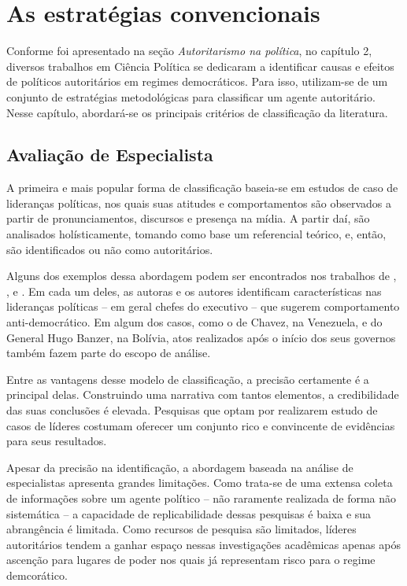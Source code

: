 \documentclass[
12pt,				%
openright,			%
twoside,			%
a4paper,			%
english,			%
french,				%
spanish,			%
brazil				%
]{abntex2}
\begin{document}
\section{As estratégias convencionais}

Conforme foi apresentado na seção \emph{Autoritarismo na política}, no capítulo 2, diversos trabalhos em Ciência Política se dedicaram a identificar causas e efeitos de políticos autoritários em regimes democráticos. Para isso, utilizam-se de um conjunto de estratégias metodológicas para classificar um agente autoritário. Nesse capítulo, abordará-se os principais critérios de classificação da literatura.

\subsection{Avaliação de Especialista}

A primeira e mais popular forma de classificação baseia-se em estudos de caso de lideranças políticas, nos quais suas atitudes e comportamentos são observados a partir de pronunciamentos, discursos e presença na mídia. A partir daí, são analisados holísticamente, tomando como base um referencial teórico, e, então, são identificados ou não como autoritários.

Alguns dos exemplos dessa abordagem podem ser encontrados nos trabalhos de , ,  e . Em cada um deles, as autoras e os autores identificam características nas lideranças políticas -- em geral chefes do executivo -- que sugerem comportamento anti-democrático. Em algum dos casos, como o de Chavez, na Venezuela, e do General Hugo Banzer, na Bolívia, atos realizados após o início dos seus governos também fazem parte do escopo de análise.

Entre as vantagens desse modelo de classificação, a precisão certamente é a principal delas. Construindo uma narrativa com tantos elementos, a credibilidade das suas conclusões é elevada. Pesquisas que optam por realizarem estudo de casos de líderes costumam oferecer um conjunto rico e convincente de evidências para seus resultados.

Apesar da precisão na identificação, a abordagem baseada na análise de especialistas apresenta grandes limitações. Como trata-se de uma extensa coleta de informações sobre um agente político -- não raramente realizada de forma não sistemática -- a capacidade de replicabilidade dessas pesquisas é baixa e sua abrangência é limitada. Como recursos de pesquisa são limitados, líderes autoritários tendem a ganhar espaço nessas investigações acadêmicas apenas após ascenção para lugares de poder nos quais já representam risco para o regime demcorático.
\end{document}
